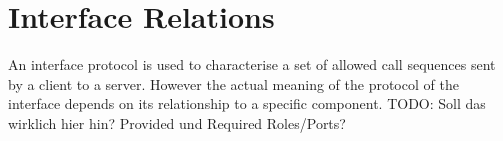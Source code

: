 %
%
%
%

\section{Interface Relations}

An interface protocol is used to characterise a set of allowed call sequences sent by a client to a server. However the actual meaning of the protocol of the interface depends on its relationship to a specific component. TODO: Soll das wirklich hier hin? Provided und Required Roles/Ports?